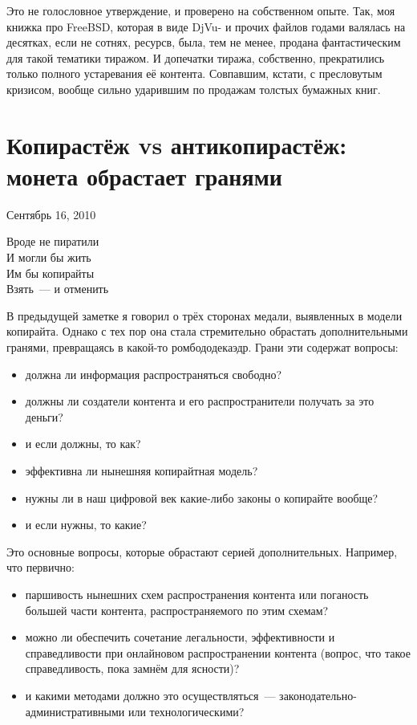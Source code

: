Это не голословное утверждение, и проверено на собственном опыте. Так, моя книжка про FreeBSD, которая в виде DjVu- и прочих файлов годами валялась  на десятках, если не сотнях, ресурсв, была, тем не менее, продана фантастическим для такой тематики тиражом. И допечатки тиража, собственно, прекратились только полного устаревания её контента. Совпавшим, кстати, с пресловутым кризисом, вообще сильно ударившим по продажам толстых бумажных книг.

\section{Копирастёж vs антикопирастёж: монета обрастает гранями}
\begin{timeline}Сентябрь 16, 2010\end{timeline}

\hfill \begin{minipage}[h]{0.45\textwidth}
Вроде не пиратили \\
И могли бы жить \\
Им бы копирайты \\
Взять~--- и отменить
\bigskip\end{minipage}

В предыдущей заметке я говорил о трёх сторонах медали, выявленных в модели копирайта. Однако с тех пор она стала стремительно обрастать дополнительными гранями, превращаясь в какой-то ромбододекаэдр. Грани эти содержат вопросы:

\begin{itemize}
	\item должна ли информация распространяться свободно? 
	\item должны ли создатели контента и его распространители получать за это деньги? 
	\item и если должны, то как? 
	\item эффективна ли нынешняя копирайтная модель? 
	\item нужны ли в наш цифровой век какие-либо законы о копирайте вообще? 
	\item и если нужны, то какие?
\end{itemize}

Это основные вопросы, которые обрастают серией дополнительных. Например, что первично:

\begin{itemize}
	\item паршивость нынешних схем распространения контента или поганость большей части контента, распространяемого по этим схемам? 
	\item можно ли обеспечить сочетание легальности, эффективности и справедливости при онлайновом распространении контента (вопрос, что такое справедливость, пока замнём для ясности)? 
	\item и какими методами должно это осуществляться~--- законодательно-административными или технологическими? 
\end{itemize}

